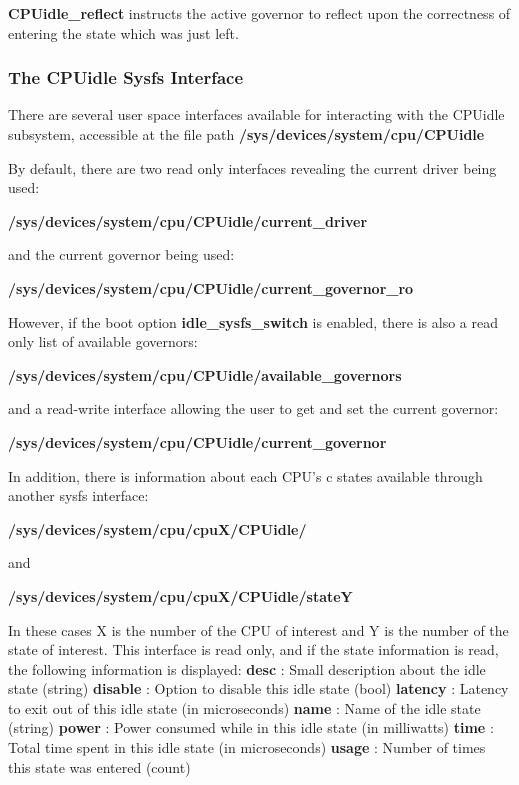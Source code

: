 \documentclass[10pt,preprint]{sigplanconf}
\begin{document}
\textbf{CPUidle\_reflect} instructs the active governor to reflect upon the correctness of entering the state which was just left.

\subsubsection{The CPUidle Sysfs Interface}


There are several user space interfaces available for interacting with the CPUidle subsystem, accessible at the file path \textbf{/sys/devices/system/cpu/CPUidle}

By default, there are two read only interfaces revealing the current driver being used: 

\textbf{/sys/devices/system/cpu/CPUidle/current\_driver}

and the current governor being used: 

\textbf{/sys/devices/system/cpu/CPUidle/current\_governor\_ro}

\vfill
\clearpage
However, if the boot option \textbf{idle\_sysfs\_switch} is enabled, there is also a read only list of available governors: 

\textbf{/sys/devices/system/cpu/CPUidle/available\_governors}

and a read-write interface allowing the user to get and set the current governor:

\textbf{/sys/devices/system/cpu/CPUidle/current\_governor}

In addition, there is information about each CPU’s c states available through another sysfs interface:

\textbf{/sys/devices/system/cpu/cpuX/CPUidle/}

and

\textbf{/sys/devices/system/cpu/cpuX/CPUidle/stateY}

In these cases X is the number of the CPU of interest and Y is the number of the state of interest. This interface is read only, and if the state information is read, the following information is displayed: \newline
 \textbf{desc} : Small description about the idle state (string)\newline
 \textbf{disable} : Option to disable this idle state (bool)\newline
 \textbf{latency} : Latency to exit out of this idle state (in microseconds)\newline
 \textbf{name} : Name of the idle state (string)\newline
 \textbf{power} : Power consumed while in this idle state (in milliwatts)\newline
 \textbf{time} : Total time spent in this idle state (in microseconds)\newline
 \textbf{usage} : Number of times this state was entered (count)\newline
\end{document}
